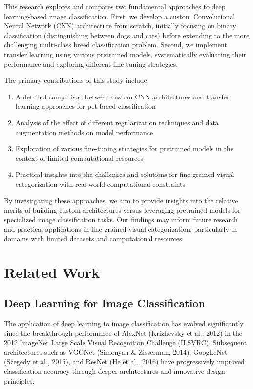\documentclass[
]{article}
\providecommand{\tightlist}{%
  \setlength{\itemsep}{0pt}\setlength{\parskip}{0pt}}\usepackage{longtable,booktabs,array}
\begin{document}
This research explores and compares two fundamental approaches to deep
learning-based image classification. First, we develop a custom
Convolutional Neural Network (CNN) architecture from scratch, initially
focusing on binary classification (distinguishing between dogs and cats)
before extending to the more challenging multi-class breed
classification problem. Second, we implement transfer learning using
various pretrained models, systematically evaluating their performance
and exploring different fine-tuning strategies.

The primary contributions of this study include:

\begin{enumerate}
\def\labelenumi{\arabic{enumi}.}
\tightlist
\item
  A detailed comparison between custom CNN architectures and transfer
  learning approaches for pet breed classification
\item
  Analysis of the effect of different regularization techniques and data
  augmentation methods on model performance
\item
  Exploration of various fine-tuning strategies for pretrained models in
  the context of limited computational resources
\item
  Practical insights into the challenges and solutions for fine-grained
  visual categorization with real-world computational constraints
\end{enumerate}

By investigating these approaches, we aim to provide insights into the
relative merits of building custom architectures versus leveraging
pretrained models for specialized image classification tasks. Our
findings may inform future research and practical applications in
fine-grained visual categorization, particularly in domains with limited
datasets and computational resources.

\section{Related Work}\label{related-work}

\subsection{Deep Learning for Image
Classification}\label{deep-learning-for-image-classification}

The application of deep learning to image classification has evolved
significantly since the breakthrough performance of AlexNet (Krizhevsky
et al., 2012) in the 2012 ImageNet Large Scale Visual Recognition
Challenge (ILSVRC). Subsequent architectures such as VGGNet (Simonyan \&
Zisserman, 2014), GoogLeNet (Szegedy et al., 2015), and ResNet (He et
al., 2016) have progressively improved classification accuracy through
deeper architectures and innovative design principles.
\end{document}
